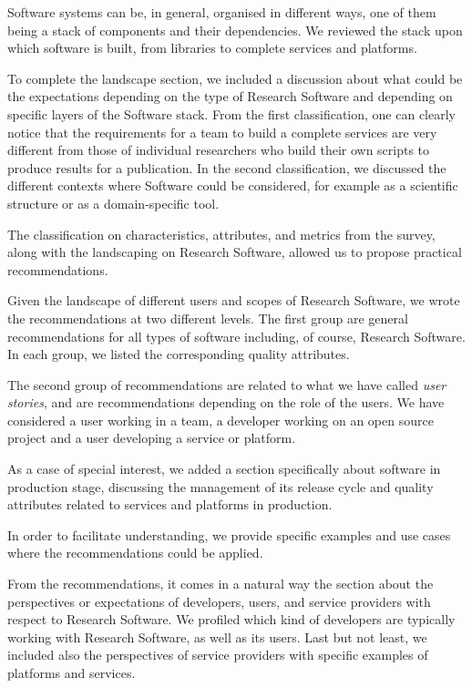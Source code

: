 Software systems can be, in general, organised in different ways, one of them being a stack of components and their dependencies. We reviewed the stack upon which software is built, from libraries to complete services and platforms. 

To complete the landscape section, we included a discussion about what could be the expectations depending on the type of Research Software and depending on specific layers of the Software stack. From the first classification, one can clearly notice that the requirements for a team to build a complete services are very different from those of individual researchers who build their own scripts to produce results for a publication. In the second classification, we discussed the different contexts where Software could be considered, for example as a scientific structure or as a domain-specific tool.

The classification on characteristics, attributes, and metrics from the survey, along with the landscaping on Research Software, allowed us to propose practical recommendations.

Given the landscape of different users and scopes of Research Software, we wrote the recommendations at two different levels. The first group are general recommendations for all types of software including, of course, Research Software. In each group, we listed the corresponding quality attributes.

The second group of recommendations are related to what we have called \textit{user stories}, and are recommendations depending on the role of the users. We have considered a user working in a team, a developer working on an open source project and a user developing a service or platform.

As a case of special interest, we added a section specifically about software in production stage, discussing the management of its release cycle and quality attributes related to services and platforms in production.

In order to facilitate understanding, we provide specific examples and use cases where the recommendations could be applied.

From the recommendations, it comes in a natural way the section about the perspectives or expectations of developers, users, and service providers with respect to Research Software. We profiled which kind of developers are typically working with Research Software, as well as its users. Last but not least, we included also the perspectives of service providers with specific examples of platforms and services.

